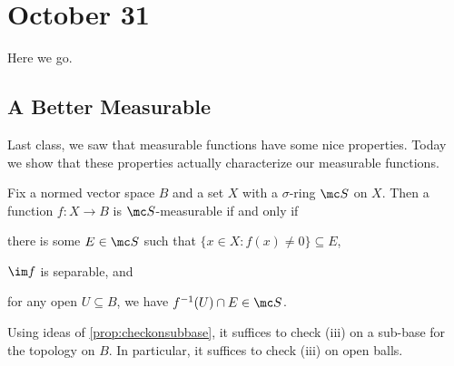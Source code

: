 \documentclass[../notes.tex]{subfiles}
\begin{document}
\section{October 31}

Here we go.

\subsection{A Better Measurable}
Last class, we saw that measurable functions have some nice properties. Today we show that these properties actually characterize our measurable functions.
\begin{theorem}
	Fix a normed vector space $B$ and a set $X$ with a $\sigma$-ring $\mc S$ on $X$. Then a function $f\colon X\to B$ is $\mc S$-measurable if and only if
	\begin{listroman}
		\item there is some $E\in\mc S$ such that $\{x\in X:f(x)\ne0\}\subseteq E$,
		\item $\im f$ is separable, and
		\item for any open $U\subseteq B$, we have $f^{-1}(U)\cap E\in\mc S$.
	\end{listroman}
\end{theorem}
\begin{remark}
	Using ideas of \autoref{prop:checkonsubbase}, it suffices to check (iii) on a sub-base for the topology on $B$. In particular, it suffices to check (iii) on open balls.
\end{remark}
\end{document}
